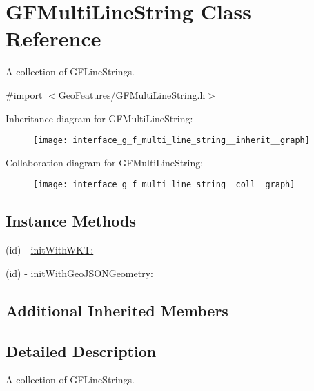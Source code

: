\hypertarget{interface_g_f_multi_line_string}{}\section{G\+F\+Multi\+Line\+String Class Reference}
\label{interface_g_f_multi_line_string}


A collection of G\+F\+Line\+Strings.  




{\ttfamily \#import $<$Geo\+Features/\+G\+F\+Multi\+Line\+String.\+h$>$}



Inheritance diagram for G\+F\+Multi\+Line\+String\+:\nopagebreak
\begin{figure}[H]
\begin{center}
\leavevmode
\texttt{[image: interface\_g\_f\_multi\_line\_string\_\_inherit\_\_graph]}
\end{center}
\end{figure}


Collaboration diagram for G\+F\+Multi\+Line\+String\+:\nopagebreak
\begin{figure}[H]
\begin{center}
\leavevmode
\texttt{[image: interface\_g\_f\_multi\_line\_string\_\_coll\_\_graph]}
\end{center}
\end{figure}
\subsection*{Instance Methods}
\begin{DoxyCompactItemize}
\item 
(id) -\/ \hyperlink{interface_g_f_multi_line_string_adddb143dc38b5f7611559ee53906ac5d}{init\+With\+W\+K\+T\+:}
\item 
(id) -\/ \hyperlink{interface_g_f_multi_line_string_add9c4b2526275719797deac98af60e8b}{init\+With\+Geo\+J\+S\+O\+N\+Geometry\+:}
\end{DoxyCompactItemize}
\subsection*{Additional Inherited Members}


\subsection{Detailed Description}
A collection of G\+F\+Line\+Strings. 

